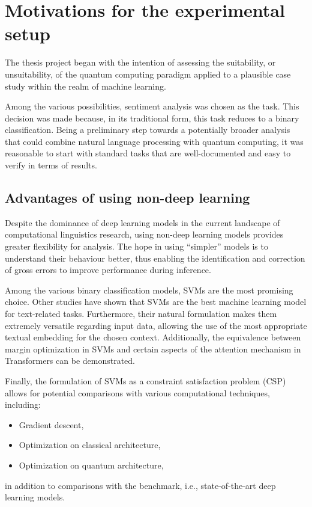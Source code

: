 \chapter{Motivations for the experimental setup}

The thesis project began with the intention of assessing the suitability, or unsuitability, of the quantum computing paradigm applied to a plausible case study within the realm of machine learning.

Among the various possibilities, sentiment analysis was chosen as the task. This decision was made because, in its traditional form, this task reduces to a binary classification. Being a preliminary step towards a potentially broader analysis that could combine natural language processing with quantum computing, it was reasonable to start with standard tasks that are well-documented and easy to verify in terms of results.

\section{Advantages of using non-deep learning}

Despite the dominance of deep learning models in the current landscape of computational linguistics research, using non-deep learning models provides greater flexibility for analysis. The hope in using ``simpler'' models is to understand their behaviour better, thus enabling the identification and correction of gross errors to improve performance during inference.

Among the various binary classification models, SVMs are the most promising choice. Other studies have shown that SVMs are the best machine learning model for text-related tasks\cite{ML4NLP}. Furthermore, their natural formulation makes them extremely versatile regarding input data, allowing the use of the most appropriate textual embedding for the chosen context. Additionally, the equivalence between margin optimization in SVMs and certain aspects of the attention mechanism in Transformers can be demonstrated\cite{TransformerSVM}.

Finally, the formulation of SVMs as a constraint satisfaction problem (CSP) allows for potential comparisons with various computational techniques, including:

\begin{itemize}
    \item Gradient descent,
	\item Optimization on classical architecture,
	\item Optimization on quantum architecture,
\end{itemize}
in addition to comparisons with the benchmark, i.e.,  state-of-the-art deep learning models.

